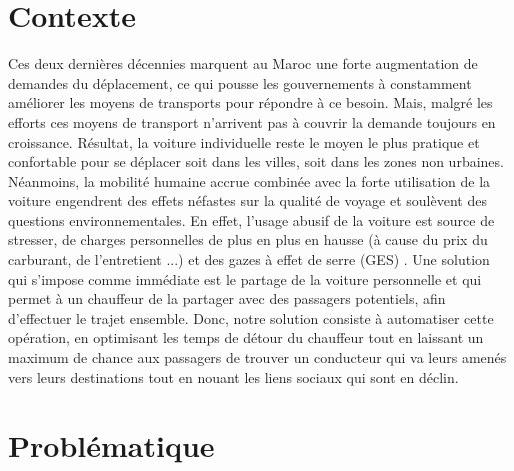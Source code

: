 
\section{Contexte}

Ces deux dernières décennies marquent au Maroc une forte augmentation de demandes du déplacement, ce qui pousse les gouvernements à constamment améliorer les moyens de transports pour répondre à ce besoin.\newline
Mais, malgré les efforts ces moyens de transport n'arrivent pas à couvrir la demande toujours en croissance.\newline
Résultat, la voiture individuelle reste le moyen le plus pratique et confortable pour se déplacer soit dans les villes, soit dans les zones non urbaines. Néanmoins, la mobilité humaine accrue combinée avec la forte utilisation de la voiture engendrent des effets néfastes sur la qualité de voyage et soulèvent des questions environnementales.\newline
En effet, l'usage abusif de la voiture est source de stresser, de charges personnelles de plus en plus en hausse (à cause du prix du carburant, de l'entretient ...) et des gazes à effet de serre (GES) .\newline
Une solution qui s'impose comme immédiate est le partage de la voiture personnelle et qui permet à un chauffeur de la partager avec des passagers potentiels, afin d'effectuer le trajet ensemble.\newline
Donc, notre solution consiste à automatiser cette opération, en optimisant les temps de détour du chauffeur tout en laissant un maximum de chance aux passagers de trouver un conducteur qui va leurs amenés vers leurs destinations tout en nouant les liens sociaux qui sont en déclin.

\section{Problématique}

